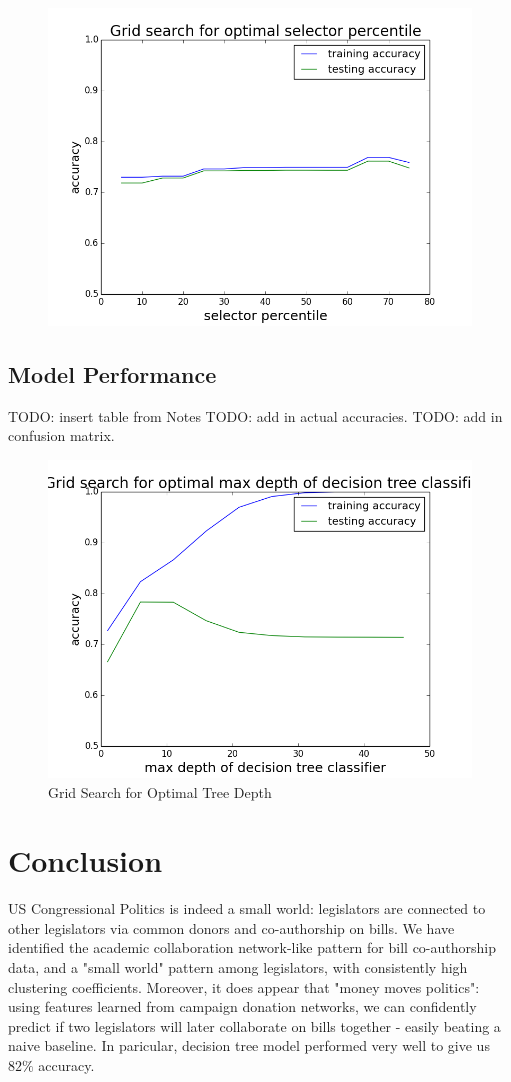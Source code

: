 \documentclass[12pt,twocolumn]{article}
\begin{document}
\begin{figure}
\centering
\includegraphics[width=0.7\linewidth]{selector_percentile_grid_search}
\caption{}
\label{fig:selectorpercentilegridsearch}
\end{figure}

\subsection{Model Performance}

TODO: insert table from Notes
TODO: add in actual accuracies. 
TODO: add in confusion matrix. 

\begin{figure}
\centering
\includegraphics[width=0.7\linewidth]{max_depth_grid}
\caption{ Grid Search for Optimal Tree Depth}
\label{fig:max_depth_grid}
\end{figure}

\section{Conclusion}
US Congressional Politics is indeed a small world: legislators are connected to other legislators via common donors and co-authorship on bills. We have identified the academic collaboration network-like pattern for bill co-authorship data, and a "small world" pattern among legislators, with consistently high clustering coefficients. Moreover, it does appear that "money moves politics": using features learned from campaign donation networks, we can confidently predict if two legislators will later collaborate on bills together - easily beating a naive baseline. In paricular, decision tree model performed very well to give us $82\%$ accuracy. 
\end{document}
